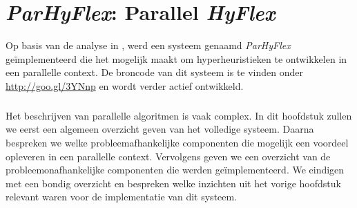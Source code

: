 \chapter{\emph{ParHyFlex}: Parallel \emph{HyFlex}}


Op basis van de analyse in , werd een systeem genaamd \emph{ParHyFlex} ge\"implementeerd die het mogelijk maakt om hyperheuristieken te ontwikkelen in een parallelle context. De broncode van dit systeem is te vinden onder \mbox{\url{http://goo.gl/3YNnp}} en wordt verder actief ontwikkeld.

\paragraph{}
Het beschrijven van parallelle algoritmen is vaak complex. In dit hoofdstuk zullen we eerst een algemeen overzicht geven van het volledige systeem. Daarna bespreken we welke probleemafhankelijke componenten die mogelijk een voordeel opleveren in een parallelle context. Vervolgens geven we een overzicht van de probleemonafhankelijke componenten die werden ge\"implementeerd. We eindigen met een bondig overzicht en bespreken welke inzichten uit het vorige hoofdstuk relevant waren voor de implementatie van dit systeem.







%

